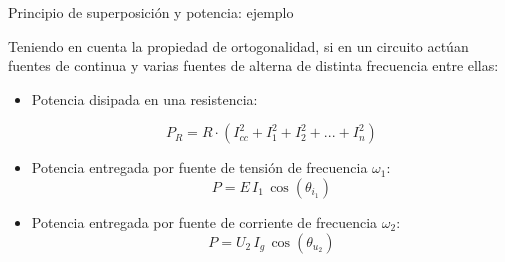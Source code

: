 \documentclass[aspectratio=169, usenames,svgnames,dvipsnames]{beamer}
\begin{document}
\begin{frame}
{Principio de superposición y potencia: \hspace{3mm}ejemplo}

    \vspace{3mm}
    Teniendo en cuenta la propiedad de ortogonalidad, si en un circuito actúan \alert{fuentes de continua} y \alert{varias fuentes de alterna} de \alert{distinta frecuencia} entre ellas:

    \vspace{2mm}
    \begin{itemize}
        \item Potencia disipada en una \alert{resistencia}:

        \vspace{-4mm}
        \begin{equation*}
            {P_R=R\cdot\left(I_{cc}^2+I_1^2+I_2^2+...+I_n^2 \right)}
        \end{equation*}

        \vspace{2mm}
        \item \alert{Potencia entregada por fuente de tensión} de frecuencia $\omega_1$: 
        \begin{equation*}
            {P=E\,I_1\,\cos(\theta_{i_1})}
        \end{equation*}

        \vspace{2mm}
        \item \alert{Potencia entregada por fuente de corriente} de frecuencia $\omega_2$: 
        \begin{equation*}
            {P=U_2\,I_{g}\,\cos(\theta_{u_2})}
        \end{equation*}
        
        \vspace*{2mm}
    \end{itemize}
\end{frame}
\end{document}
